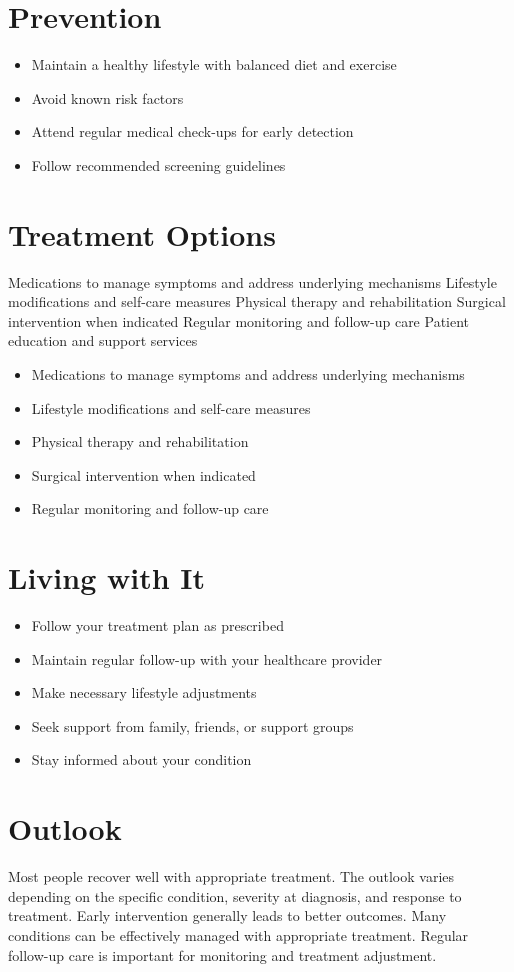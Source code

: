 \section{Prevention}
\begin{itemize}[noitemsep]
  \item Maintain a healthy lifestyle with balanced diet and exercise
  \item Avoid known risk factors
  \item Attend regular medical check-ups for early detection
  \item Follow recommended screening guidelines
\end{itemize}
\section{Treatment Options}
Medications to manage symptoms and address underlying mechanisms Lifestyle modifications and self-care measures Physical therapy and rehabilitation Surgical intervention when indicated Regular monitoring and follow-up care Patient education and support services

\begin{itemize}[noitemsep]
  \item Medications to manage symptoms and address underlying mechanisms
  \item Lifestyle modifications and self-care measures
  \item Physical therapy and rehabilitation
  \item Surgical intervention when indicated
  \item Regular monitoring and follow-up care
\end{itemize}
\section{Living with It}
\begin{itemize}[noitemsep]
  \item Follow your treatment plan as prescribed
  \item Maintain regular follow-up with your healthcare provider
  \item Make necessary lifestyle adjustments
  \item Seek support from family, friends, or support groups
  \item Stay informed about your condition
\end{itemize}
\section{Outlook}
Most people recover well with appropriate treatment. The outlook varies depending on the specific condition, severity at diagnosis, and response to treatment. Early intervention generally leads to better outcomes. Many conditions can be effectively managed with appropriate treatment. Regular follow-up care is important for monitoring and treatment adjustment.

